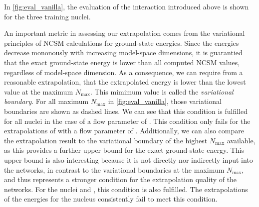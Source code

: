 In \autoref{fig:eval_vanilla}, the evaluation of the interaction introduced above is shown for the three training nuclei.

An important metric in assessing our extrapolation comes from the variational principles of NCSM calculations for ground-state energies. Since the energies decrease mononously with increasing model-space dimensions, it is guarantied that the exact ground-state energy is lower than all computed NCSM values, regardless of model-space dimension. As a consequence, we can require from a reasonable extrapolation, that the extrapolated energy is lower than the lowest value at the maximum $N_\mathrm{max}$. This mimimum value is called the \textit{variational boundary}. For all maximum $N_\mathrm{max}$ in \autoref{fig:eval_vanilla}, those variational boundaries are shown as dashed lines. We can see that this condition is fulfilled for all nuclei in the case of a flow parameter of . This condition only fails for the extrapolations of  with a flow parameter of . Additionally, we can also compare the extrapolation result to the variational boundary of the highest $N_\mathrm{max}$ available, as this provides a further upper bound for the exact ground-state energy. This upper bound is also interesting because it is not directly nor indirectly input into the networks, in contrast to the variational boundaries at the maximum $N_\mathrm{max}$, and thus represents a stronger condition for the extrapolation quality of the networks. For the nuclei  and , this condition is also fulfilled. The extrapolations of the energies for the  nucleus consistently fail to meet this condition.

